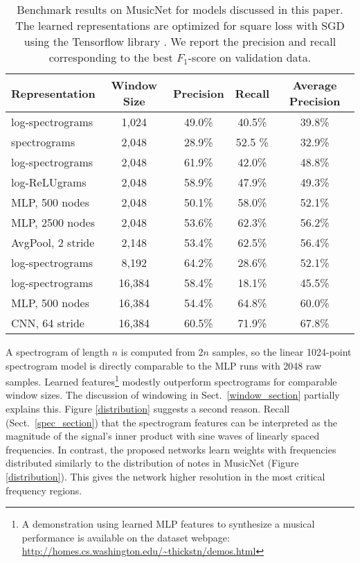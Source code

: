 \documentclass{article} \usepackage{iclr2017_conference,times}
\begin{document}
\begin{table}[h]
  \centering
  \begin{tabular}{lcccc}
    \toprule
    \cmidrule{1-5}
    Representation & Window Size & Precision & Recall & Average Precision \\
    \midrule
    log-spectrograms & 1,024 & 49.0\% & 40.5\% & 39.8\% \\
    spectrograms & 2,048 & 28.9\% & 52.5 \% & 32.9\% \\
    log-spectrograms & 2,048 & 61.9\% & 42.0\% & 48.8\% \\
    log-ReLUgrams & 2,048 & 58.9\% & 47.9\% & 49.3\% \\
    MLP, 500 nodes & 2,048 & 50.1\% & 58.0\% & 52.1\% \\
    MLP, 2500 nodes & 2,048 & 53.6\% & 62.3\% & 56.2\% \\
    AvgPool, 2 stride & 2,148 & 53.4\% & 62.5\% & 56.4\% \\
    log-spectrograms & 8,192 & 64.2\% & 28.6\% & 52.1\% \\
    log-spectrograms & 16,384 & 58.4\% & 18.1\% & 45.5\% \\
    MLP, 500 nodes & 16,384 & 54.4\% & 64.8\% & 60.0\% \\
    CNN, 64 stride & 16,384 & 60.5\% & 71.9\% & 67.8\% \\
    \bottomrule
  \end{tabular}
  \caption{Benchmark results on MusicNet for models discussed in this paper. The learned representations are optimized for square loss with SGD using the Tensorflow library \citep{tensorflow}. We report the precision and recall corresponding to the best $F_1$-score on validation data.}
  \label{results}
\end{table}

A spectrogram of length $n$ is computed from $2n$ samples, so the linear 1024-point spectrogram model is directly comparable to the MLP runs with 2048 raw samples. Learned features\footnote{A demonstration using learned MLP features to synthesize a musical performance is available on the dataset webpage: \url{http://homes.cs.washington.edu/~thickstn/demos.html}} modestly outperform spectrograms for comparable window sizes. The discussion of windowing in Sect.~\ref{window_section} partially explains this. Figure \ref{distribution} suggests a second reason. Recall (Sect.~\ref{spec_section}) that the spectrogram features can be interpreted as the magnitude of the signal's inner product with sine waves of linearly spaced frequencies. In contrast, the proposed networks learn weights with frequencies distributed similarly to the distribution of notes in MusicNet (Figure \ref{distribution}). This gives the network higher resolution in the most critical frequency regions.
\end{document}
